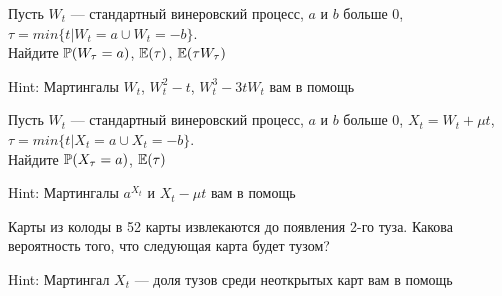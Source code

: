 \begin{problem}
Пусть $W_{t}$ — стандартный винеровский процесс, $a$ и $b$ больше 0, $\tau=min\{t|W_{t}=a \cup W_{t}=-b\}$. \\
Найдите $\P(W_{\tau}=a)$, $\E(\tau)$, $\E(\tau W_{\tau})$

\begin{sol}

Hint: Мартингалы $W_{t}$, $W_{t}^2-t$, $W_{t}^{3}-3tW_{t}$ вам в помощь
\end{sol}
\end{problem}

\begin{problem}
Пусть $W_{t}$ — стандартный винеровский процесс, $a$ и $b$ больше 0, $X_{t}=W_{t}+\mu t$, $\tau=min\{t|X_{t}=a \cup X_{t}=-b\}$. \\
Найдите $\P(X_{\tau}=a)$, $\E(\tau)$

\begin{sol}

Hint: Мартингалы $a^{X_{t}}$ и $X_{t}-\mu t$ вам в помощь
\end{sol}
\end{problem}

\begin{problem}
Карты из колоды в 52 карты извлекаются до появления 2-го туза. Какова вероятность того, что следующая карта будет тузом?

\begin{sol}

Hint: Мартингал $X_{t}$ — доля тузов среди неоткрытых карт вам в помощь
\end{sol}
\end{problem}

